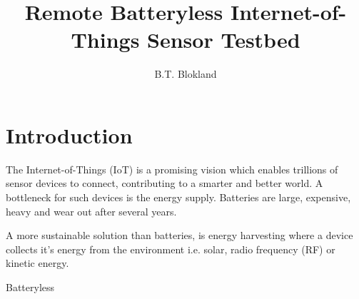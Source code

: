 \documentclass[]{article}
\title{Remote Batteryless Internet-of-Things Sensor Testbed}
\author{B.T. Blokland}
\begin{document}
\maketitle

\section{Introduction}

The Internet-of-Things (IoT) is a promising vision which enables trillions of sensor devices to connect, contributing to a smarter and better world. A bottleneck for such devices is the energy supply. Batteries are large, expensive, heavy and wear out after several years.

A more sustainable solution than batteries, is energy harvesting where a device collects it's energy from the environment i.e. solar, radio frequency (RF) or kinetic energy.

Batteryless 
\end{document}

